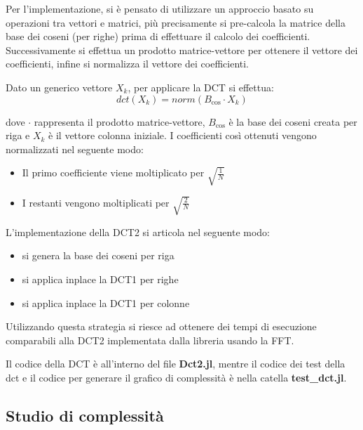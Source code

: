 Per l'implementazione, si è pensato di utilizzare un approccio basato su operazioni
tra vettori e matrici, più precisamente si pre-calcola la matrice
della base dei coseni (per righe) prima di effettuare il calcolo dei coefficienti.
Successivamente si effettua un prodotto matrice-vettore per ottenere il vettore
dei coefficienti, infine si normalizza il vettore dei coefficienti.

Dato un generico vettore $X_k$, per applicare la DCT si effettua:
\begin{equation*}
    dct(X_k) = norm(B_{\cos}\cdot X_k )
\end{equation*}

dove $\cdot$ rappresenta il prodotto matrice-vettore, $B_{\cos}$
è la base dei coseni creata per riga e $X_k$ è il vettore colonna iniziale.
I coefficienti così ottenuti vengono normalizzati nel seguente modo:
\begin{itemize}
    \item Il primo coefficiente viene moltiplicato per $\sqrt{\frac{1}{N}}$
    \item I restanti vengono moltiplicati per $\sqrt{\frac{2}{N}}$
\end{itemize}

L'implementazione della DCT2 si articola nel seguente modo:
\begin{itemize}
    \item si genera la base dei coseni per riga
    \item si applica inplace la DCT1 per righe
    \item si applica inplace la DCT1 per colonne
\end{itemize}

Utilizzando questa strategia si riesce ad ottenere dei tempi di esecuzione
comparabili alla DCT2 implementata dalla libreria usando la FFT.

Il codice della DCT è all'interno del file \textbf{Dct2.jl}, mentre il codice dei 
test della dct e il codice per generare il grafico di complessità è nella catella
\textbf{test\_dct.jl}.


\subsection{Studio di complessità}

